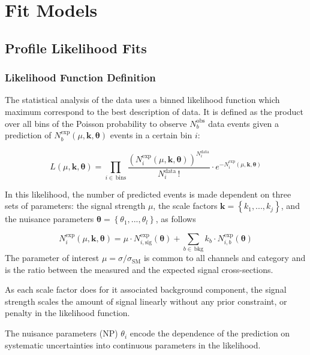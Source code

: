 \chapter{Fit Models}
\label{ch:fit-models}
\section{Profile Likelihood Fits}%
\label{sec:plf}
\subsection{Likelihood Function Definition}
\label{sec:lhoodDef}
The statistical analysis of the data uses a binned likelihood function which
maximum correspond to the best description of data. It is defined as the product
over all bins of the Poisson probability to observe $N^{\text{obs}}_b$ data
events given a prediction of
$N^{\text{exp}}_b(\mu,\mathbf{k},{\bm\theta})$ events in a certain bin
$i$:

\begin{equation}
  L(\mu,{\bm{k},\bm{\theta}}) =
  \prod_{i\in\,\text{bins}} \frac{\left( N_{i}^{\text{exp}}(\mu,{\bm{k,\theta}}) \right)^{N_{i}^{\text{data}}}}{N_{i}^{\text{data}}\,!}
  \cdot e^{-N_{i}^{\text{exp}}(\mu,{\bm{k,\theta}})}
\end{equation}

In this likelihood, the number of predicted events is made dependent on three
sets of parameters: the signal strength $\mu$, the scale factors
$\mathbf{k}=\left\{k_1, ...,k_j\right\}$, and the nuisance parameters
$\bm{\theta} = \left\{\theta_1,...,\theta_l\right\}$, as follows

\begin{equation}
  N_{i}^{\text{exp}}(\mu,\mathbf{k},\bm{\theta}) = \mu \cdot N_{i,\text{sig}}^{\text{exp}}(\bm{\theta}) + \sum_{b\in\,\text{bkg}} k_b\cdot N_{i,b}^{\text{exp}}(\bm{\theta})
\end{equation}
The parameter of interest $\mu=\sigma/\sigma_{\text{SM}}$ is common to all
channels and category and is the ratio between the measured and the expected
signal cross-sections.

As each scale factor does for it associated background component, the signal
strength scales the amount of signal linearly without any prior constraint, or
penalty in the likelihood function.


The nuisance parameters (NP) $\theta_i$ encode the dependence of the prediction
on systematic uncertainties into continuous parameters in the likelihood.

